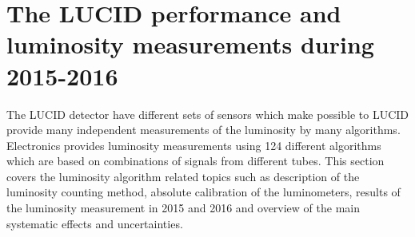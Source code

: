 
\section{The LUCID performance and luminosity measurements during 2015-2016}
\label{sec:lucid_performance}

The LUCID detector have different sets of sensors which make possible to LUCID provide many independent measurements of the luminosity by many algorithms.
Electronics provides luminosity measurements using 124 different algorithms which are based on combinations of signals from different tubes.
This section covers the luminosity algorithm related topics such as description of the luminosity counting method, absolute calibration of the luminometers, 
results of the luminosity measurement in 2015 and 2016 and overview of the main systematic effects and uncertainties.


